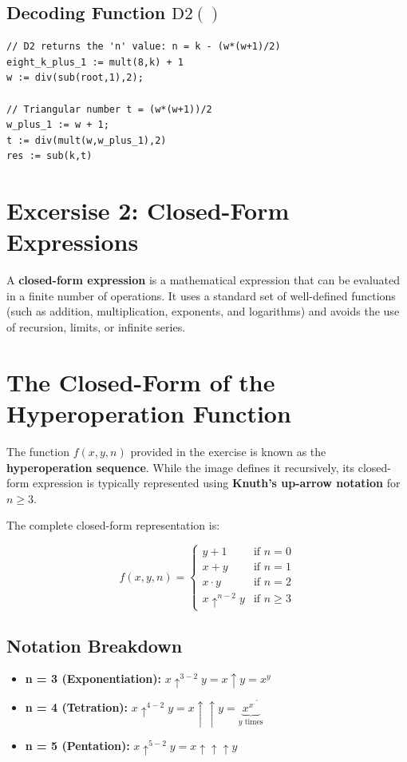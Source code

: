 \documentclass[11pt,a4paper]{article}
\begin{document}
\subsection*{ Decoding Function $\text{D2}()$}

\begin{lstlisting}[language=LOOP]
// D2 returns the 'n' value: n = k - (w*(w+1)/2)
eight_k_plus_1 := mult(8,k) + 1
w := div(sub(root,1),2);

// Triangular number t = (w*(w+1))/2
w_plus_1 := w + 1;
t := div(mult(w,w_plus_1),2)
res := sub(k,t)
\end{lstlisting}

\pagebreak
\section*{Excersise 2: Closed-Form Expressions}

A \textbf{closed-form expression} is a mathematical expression that can be evaluated in a finite number of operations. It uses a standard set of well-defined functions (such as addition, multiplication, exponents, and logarithms) and avoids the use of recursion, limits, or infinite series.

\section*{The Closed-Form of the Hyperoperation Function}

The function $f(x, y, n)$ provided in the exercise is known as the \textbf{hyperoperation sequence}. While the image defines it recursively, its closed-form expression is typically represented using \textbf{Knuth's up-arrow notation} for $n \ge 3$.

The complete closed-form representation is:

\[
f(x, y, n) = 
\begin{cases} 
y + 1 & \text{if } n = 0 \\
x + y & \text{if } n = 1 \\
x \cdot y & \text{if } n = 2 \\
x \uparrow^{n-2} y & \text{if } n \ge 3 
\end{cases}
\]

\subsection*{Notation Breakdown}
\begin{itemize}
    \item \textbf{n = 3 (Exponentiation):} $x \uparrow^{3-2} y = x \uparrow y = x^y$
    \item \textbf{n = 4 (Tetration):} $x \uparrow^{4-2} y = x \uparrow\uparrow y = \underbrace{x^{x^{\cdot^{\cdot^x}}}}_{y \text{ times}}$
    \item \textbf{n = 5 (Pentation):} $x \uparrow^{5-2} y = x \uparrow\uparrow\uparrow y$
\end{itemize}
\end{document}
